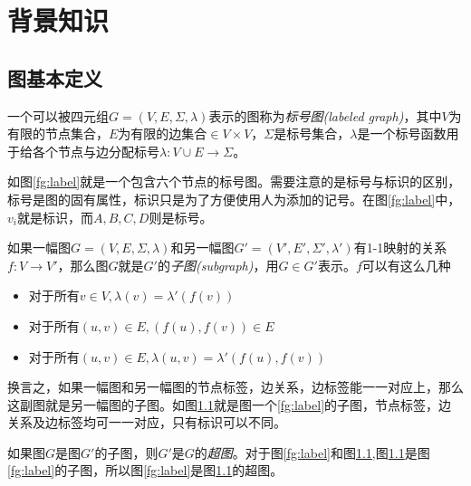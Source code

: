 \documentclass{XDBAthesis}
\begin{document}
\else
\fi
\chapter{背景知识}
\label{chap:background}
\section{图基本定义}
\begin{defn}
    一个可以被四元组$G=(V,E,\Sigma,\lambda)$表示的图称为\emph{标号图(labeled graph)}，其中$V$为有限的节点集合，$E$为有限的边集合$\in V\times V$，$\Sigma$是标号集合，$\lambda$是一个标号函数用于给各个节点与边分配标号$\lambda :V\cup E\rightarrow\Sigma$。
\end{defn}
如图\ref{fg:label}就是一个包含六个节点的标号图。需要注意的是标号与标识的区别，标号是图的固有属性，标识只是为了方便使用人为添加的记号。在图\ref{fg:label}中，$v_i $就是标识，而$A,B,C,D$则是标号。

\begin{figure}[htp]
    \begin{minipage}{0.5\textwidth}
        \centering
        
        \label{fg:label}
    \end{minipage}%
    \begin{minipage}{0.5\textwidth}
        \centering
        
        \label{fg:sub}
    \end{minipage}\hfill
\end{figure}
\begin{defn}[子图]
    如果一幅图$G=(V,E,\Sigma,\lambda)$和另一幅图$G'=(V',E',\Sigma',\lambda')$有1-1映射的关系$f:V\rightarrow V'$，那么图$G$就是$G'$的\emph{子图(subgraph)}，用$G\in G' $表示。$f$可以有这么几种
\begin{itemize}
    \item 对于所有$v\in V,\lambda(v)=\lambda '(f(v))$
    \item 对于所有$(u,v)\in E,(f(u),f(v))\in E$
    \item 对于所有$(u,v)\in E,\lambda(u,v)=\lambda '(f(u),f(v)) $
\end{itemize}
\end{defn}
换言之，如果一幅图和另一幅图的节点标签，边关系，边标签能一一对应上，那么这副图就是另一幅图的子图。如图\ref{fg:sub}就是图一个\ref{fg:label}的子图，节点标签，边关系及边标签均可一一对应，只有标识可以不同。
\begin{defn}[超图]
    如果图$G$是图$G'$的子图，则$G'$是$G$的\emph{超图}。对于图\ref{fg:label}和图\ref{fg:sub},图\ref{fg:sub}是图\ref{fg:label}的子图，所以图\ref{fg:label}是图\ref{fg:sub}的超图。
\end{defn}
\end{document}
